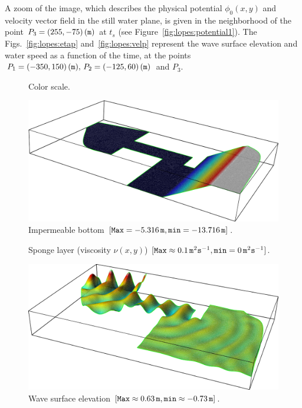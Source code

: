  A zoom of the image, which describes the physical potential
$\phi_0(x,y)$ and velocity vector field in the still water plane, is
given in the neighborhood of the point $P_3=(255,-75)\,({\tt m})$ at
$t_s$ (see Figure~\ref{fig:lopes:potential1}).  The
Figs.~\ref{fig:lopes:etap} and~\ref{fig:lopes:velp} represent the wave
surface elevation and water speed as a function of the time, at the
points $P_1=(-350, 150)\,({\tt m}),\, P_2=(-125,60)\,({\tt m})$ and
$P_3$.

\begin{figure}
  \centering
  \caption{Color scale.}
  \label{fig:lopes:scale}
\end{figure}

\begin{figure}
  \centering
  \includegraphics[width=\largefig]{chapters/lopes/pdf/depth.pdf}
  \caption{Impermeable bottom $[{\tt Max}=-5.316\,{\tt m},{\tt
      min}=-13.716\,{\tt m}]$.}
  \label{fig:lopes:harbor_depth}
\end{figure}

\begin{figure}
  \centering
  \caption{Sponge layer (viscosity $\nu(x,y)$) $[{\tt Max} \approx
    0.1\,{\tt m}^2{\tt s}^{-1}, {\tt min}=0 \,{\tt m}^2{\tt s}^{-1}]$.}
  \label{fig:lopes:sponge}
\end{figure}

\begin{figure}
  \centering
  \includegraphics[width=\largefig]{chapters/lopes/pdf/eta.pdf}
  \caption{Wave surface elevation $[{\tt Max}\approx 0.63\,{\tt m},
    {\tt min}\approx-0.73\,{\tt m}] $.}
  \label{fig:lopes:elevation}
\end{figure}

